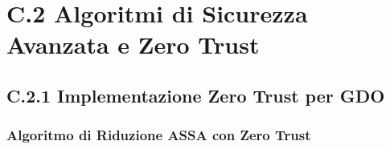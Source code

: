 \section{\texorpdfstring{\textbf{C.2 Algoritmi di Sicurezza Avanzata e Zero Trust}}{C.2 - Algoritmi di Sicurezza Avanzata e Zero Trust}}

\subsection{\texorpdfstring{\textbf{C.2.1 Implementazione Zero Trust per GDO}}{C.2.1 - Implementazione Zero Trust per GDO}}

\subsubsection{Algoritmo di Riduzione ASSA con Zero Trust}

